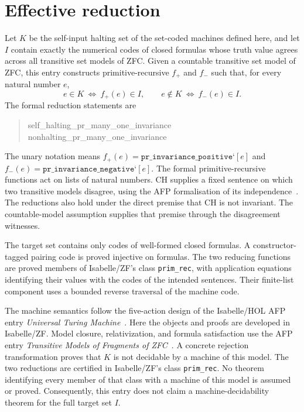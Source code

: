 \documentclass[11pt,a4paper]{article}
\begin{document}
\section{Effective reduction}
Let $K$ be the self-input halting set of the set-coded machines defined here,
and let $I$ contain exactly the numerical codes of closed formulas whose
truth value agrees across all transitive set models of ZFC. Given a
countable transitive set model of ZFC, this entry constructs
primitive-recursive $f_+$ and $f_-$ such that, for every natural number $e$,
\[
  e\in K\ \Longleftrightarrow\ f_+(e)\in I,
  \qquad
  e\notin K\ \Longleftrightarrow\ f_-(e)\in I.
\]
The formal reduction statements are
\begin{quote}
\small\ttfamily
self\_halting\_pr\_many\_one\_invariance\\
nonhalting\_pr\_many\_one\_invariance
\end{quote}
The unary notation means
$f_+(e)=\texttt{pr\_invariance\_positive}\mathbin{\texttt{`}}[e]$ and
$f_-(e)=\texttt{pr\_invariance\_negative}\mathbin{\texttt{`}}[e]$.
The formal primitive-recursive functions act on lists of natural numbers.
CH supplies a fixed sentence on which two transitive models
disagree, using the AFP formalisation of its independence~\cite{afp-ch}.
The reductions also hold under the direct premise that CH is not invariant.
The countable-model assumption supplies that premise through the
disagreement witnesses.

The target set contains only codes of well-formed closed formulas. A
constructor-tagged pairing code is proved injective on formulas. The two
reducing functions are proved members of Isabelle/ZF's class
\texttt{prim\_rec}, with application equations identifying their values
with the codes of the intended sentences. Their finite-list component uses
a bounded reverse traversal of the machine code.

The machine semantics follow the five-action design of the Isabelle/HOL
AFP entry \emph{Universal Turing Machine}~\cite{afp-utm}. Here the objects
and proofs are developed in Isabelle/ZF. Model closure, relativization, and
formula satisfaction use the AFP entry \emph{Transitive Models of Fragments
of ZFC}~\cite{afp-models}. A concrete rejection transformation
proves that $K$ is not decidable by a machine of this model. The two reductions
are certified in Isabelle/ZF's class \texttt{prim\_rec}. No theorem identifying
every member of that class with a machine of this model is assumed or proved.
Consequently, this entry does not claim a machine-decidability theorem for
the full target set $I$.
\end{document}
